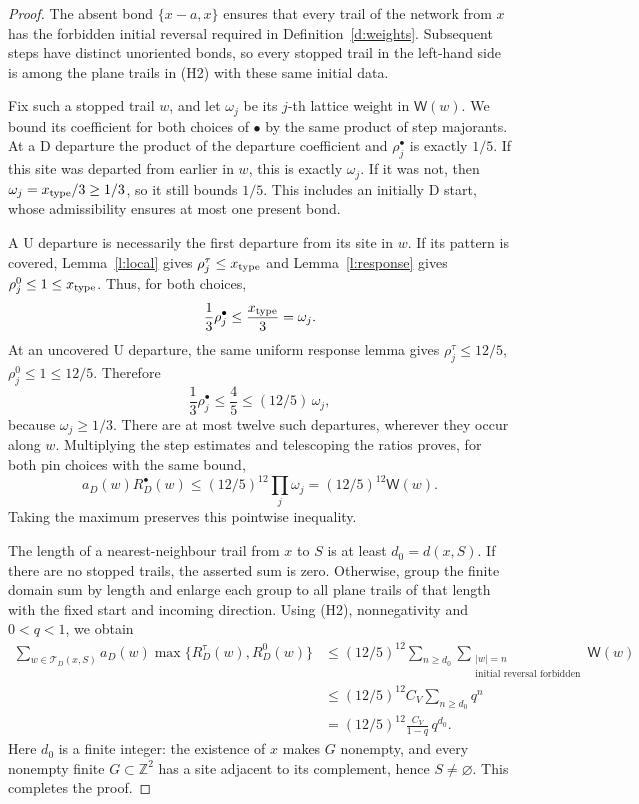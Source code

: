\begin{proof}
The absent bond \(\{x-a,x\}\) ensures that every trail of the
network from \(x\) has the forbidden initial reversal required
in Definition~\ref{d:weights}. Subsequent steps have distinct
unoriented bonds, so every stopped trail in the left-hand side
is among the plane trails in (H2) with these same initial data.

Fix such a stopped trail \(w\), and let \(\omega_j\) be its
\(j\)-th lattice weight in \(\mathsf W(w)\).
We bound its coefficient for both choices of \(\bullet\)
by the same product of step majorants.
At a \(\mathrm D\) departure the product of the departure
coefficient and \(\rho_j^\bullet\) is exactly \(1/5\).
If this site was departed from earlier in \(w\), this is
exactly \(\omega_j\). If it was not, then
\(\omega_j=x_{\rm type}/3\ge1/3\), so it still bounds \(1/5\).
This includes an initially \(\mathrm D\) start, whose
admissibility ensures at most one present bond.

A \(\mathrm U\) departure is necessarily the first departure
from its site in \(w\). If its pattern is covered,
Lemma~\ref{l:local} gives \(\rho_j^\tau\le x_{\rm type}\)
and Lemma~\ref{l:response} gives
\(\rho_j^0\le1\le x_{\rm type}\). Thus, for both choices,
\[
 \frac13\rho_j^\bullet\le\frac{x_{\rm type}}3=\omega_j.
\]
At an uncovered \(\mathrm U\) departure, the same uniform
response lemma gives \(\rho_j^\tau\le12/5\),
\(\rho_j^0\le1\le12/5\). Therefore
\[
 \frac13\rho_j^\bullet\le\frac45
          \le(12/5)\,\omega_j,
\]
because \(\omega_j\ge1/3\).
There are at most twelve such departures, wherever they occur
along \(w\). Multiplying the step estimates and telescoping
the ratios proves, for both pin choices with the same bound,
\[
 a_D(w)R_D^\bullet(w)
   \le(12/5)^{12}\prod_j\omega_j
   =(12/5)^{12}\mathsf W(w).
\]
Taking the maximum preserves this pointwise inequality.

The length of a nearest-neighbour trail from \(x\) to \(S\)
is at least \(d_0=d(x,S)\). If there are no stopped trails,
the asserted sum is zero. Otherwise, group the finite domain
sum by length and enlarge each group to all plane trails
of that length with the fixed start and incoming direction.
Using (H2), nonnegativity and \(0<q<1\), we obtain
\[
 \begin{split}
 \sum_{w\in\mathcal T_D(x,S)}
       a_D(w)\max\{R_D^\tau(w),R_D^0(w)\}
 &\le(12/5)^{12}\sum_{n\ge d_0}
              \sum_{\substack{|w|=n\\
                    \text{initial reversal forbidden}}}\mathsf W(w)\\
 &\le(12/5)^{12}C_V\sum_{n\ge d_0}q^n\\
 &=(12/5)^{12}\frac{C_V}{1-q}\,q^{d_0}.
 \end{split}
\]
Here \(d_0\) is a finite integer: the existence of \(x\) makes
\(G\) nonempty, and every nonempty finite \(G\subset\mathbb Z^2\)
has a site adjacent to its complement, hence \(S\ne\varnothing\).
This completes the proof.
\end{proof}

